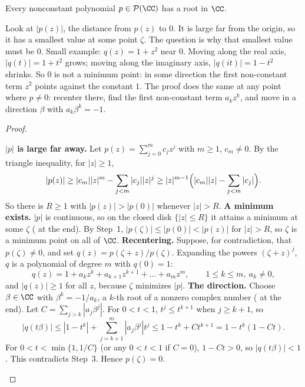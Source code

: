 \documentclass[10pt]{scrartcl}
\newcommand{\PP}{\mathcal P}\newcommand{\LL}{\mathcal L}\newcommand{\MM}{\mathcal M}\newcommand{\T}{\mathsf T}
\begin{document}
\begin{theorem*}
  Every nonconstant polynomial $p\in\PP(\CC)$ has a root in $\CC$.
\end{theorem*}
\begin{ideabox}
  Look at $|p(z)|$, the distance from $p(z)$ to $0$. It is large far from the origin, so it has a smallest value at some point $\zeta$. The question is why that smallest value must be $0$. Small example: $q(z)=1+z^2$ near $0$. Moving along the real axis, $|q(t)|=1+t^2$ grows; moving along the imaginary axis, $|q(it)|=1-t^2$ shrinks. So $0$ is not a minimum point: in some direction the first non-constant term $z^2$ points against the constant $1$. The proof does the same at any point where $p\ne0$: recenter there, find the first non-constant term $a_kz^k$, and move in a direction $\beta$ with $a_k\beta^k=-1$.
\end{ideabox}
\begin{proof}
  \begin{steps}
    \ii \textbf{$|p|$ is large far away.} Let $p(z)=\sum_{j=0}^m c_jz^j$ with $m\ge 1$, $c_m\ne 0$. By the triangle inequality, for $|z|\ge1$,
    \[
      |p(z)|\ge |c_m||z|^m-\sum_{j<m}|c_j||z|^j\ge |z|^{m-1}\Bigl(|c_m||z|-\sum_{j<m}|c_j|\Bigr).
    \]
    So there is $R\ge1$ with $|p(z)|>|p(0)|$ whenever $|z|>R$.
    \ii \textbf{A minimum exists.} $|p|$ is continuous, so on the closed disk $\{|z|\le R\}$ it attains a minimum at some $\zeta$ ( at the end). By Step~1, $|p(\zeta)|\le|p(0)|<|p(z)|$ for $|z|>R$, so $\zeta$ is a minimum point on all of $\CC$.
    \ii \textbf{Recentering.} Suppose, for contradiction, that $p(\zeta)\ne 0$, and set $q(z)=p(\zeta+z)/p(\zeta)$. Expanding the powers $(\zeta+z)^j$, $q$ is a polynomial of degree $m$ with $q(0)=1$:
    \[
      q(z)=1+a_kz^k+a_{k+1}z^{k+1}+\dots+a_mz^m,\qquad 1\le k\le m,\ a_k\ne 0,
    \]
    and $|q(z)|\ge 1$ for all $z$, because $\zeta$ minimizes $|p|$.
    \ii \textbf{The direction.} Choose $\beta\in\CC$ with $\beta^k=-1/a_k$, a $k$-th root of a nonzero complex number ( at the end). Let $C=\sum_{j>k}|a_j\beta^j|$. For $0<t<1$, $t^j\le t^{k+1}$ when $j\ge k+1$, so
    \[
      |q(t\beta)|\le |1-t^k|+\sum_{j=k+1}^m |a_j\beta^j|t^j\le 1-t^k+Ct^{k+1}=1-t^k(1-Ct).
    \]
    \ii For $0<t<\min\{1,1/C\}$ (or any $0<t<1$ if $C=0$), $1-Ct>0$, so $|q(t\beta)|<1$. This contradicts Step~3. Hence $p(\zeta)=0$.
  \end{steps}
\end{proof}
\end{document}
